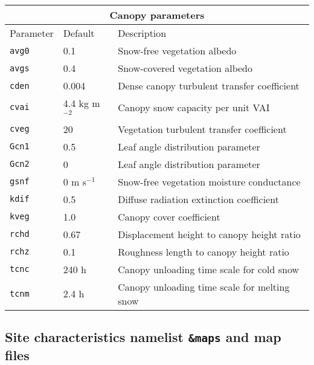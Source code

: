\documentclass{article}
\begin{document}
\begin{longtable}{|l|l|l|}
\hline
\multicolumn{3}{|c|}{Canopy parameters} \\
\hline
Parameter & Default & Description \\
\hline
{\tt avg0} & 0.1             & Snow-free vegetation albedo                  \\
{\tt avgs} & 0.4             & Snow-covered vegetation albedo               \\ 
{\tt cden} & 0.004           & Dense canopy turbulent transfer coefficient  \\
{\tt cvai} & 4.4 kg m$^{-2}$ & Canopy snow capacity per unit VAI            \\
{\tt cveg} & 20              & Vegetation turbulent transfer coefficient    \\
{\tt Gcn1} & 0.5             & Leaf angle distribution parameter            \\
{\tt Gcn2} & 0               & Leaf angle distribution parameter            \\
{\tt gsnf} & 0 m s$^{-1}$    & Snow-free vegetation moisture conductance    \\
{\tt kdif} & 0.5             & Diffuse radiation extinction coefficient     \\
{\tt kveg} & 1.0             & Canopy cover coefficient                     \\
{\tt rchd} & 0.67            & Displacement height to canopy height ratio   \\
{\tt rchz} & 0.1             & Roughness length to canopy height ratio      \\
{\tt tcnc} & 240 h           & Canopy unloading time scale for cold snow    \\
{\tt tcnm} & 2.4 h           & Canopy unloading time scale for melting snow \\
\hline 
\end{longtable}

\subsection{Site characteristics namelist {\tt \&maps} and map files}
\end{document}

